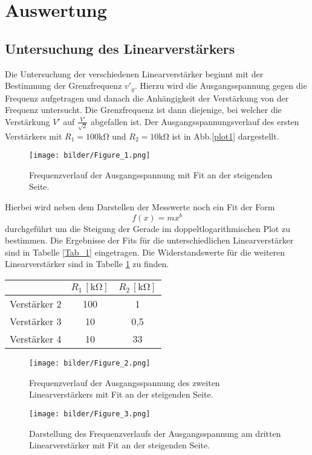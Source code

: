 \section{Auswertung}
\subsection{Untersuchung des Linearverstärkers}
Die Untersuchung der verschiedenen Linearverstärker beginnt mit der Bestimmung der Grenzfrequenz $v'_g$. Hierzu wird die Ausgangsspannung gegen die Frequenz aufgetragen und danach die Anhängigkeit der Verstärkung von der Frequenz untersucht. Die Grenzfrequenz ist dann diejenige, bei welcher die Verstärkung $V'$ auf $\frac{V'}{\sqrt{2}}$ abgefallen ist. Der Ausgangsspannungsverlauf des ersten Verstärkers mit $R_1=100\si{\kilo\ohm}$ und $R_2=10\si{\kilo\ohm}$ ist in Abb.\ref{plot1} dargestellt.
\begin{figure}[h]
  \centering
  \texttt{[image: bilder/Figure\_1.png]}
  \caption{Frequenzverlauf der Ausgangsspannung mit Fit an der steigenden Seite.}
  \label{Aufbau}
\end{figure}
Hierbei wird neben dem Darstellen der Messwerte noch ein Fit der Form
\begin{equation}
f(x)=mx^b
\end{equation}
durchgeführt um die Steigung der Gerade im doppeltlogarithmischen Plot zu bestimmen. Die Ergebnisse der Fits für die unterschiedlichen Linearverstärker sind in Tabelle \ref{Tab_1} eingetragen. Die Widerstandswerte für die weiteren Linearverstärker sind in Tabelle \ref{Tab_2} zu finden.
\begin{table}[]
\centering
\begin{tabular}{c|cc}
&$R_1\,[\si{\kilo\ohm}]$&$R_2\,[\si{\kilo\ohm}]$\\
\hline
Verstärker 2 & 100 & 1   \\
Verstärker 3 & 10  & 0,5 \\
Verstärker 4 & 10  & 33
\end{tabular}
\label{Tab_2}
\end{table}
\begin{figure}[h]
  \centering
  \texttt{[image: bilder/Figure\_2.png]}
  \caption{Frequenzverlauf der Ausgangsspannung des zweiten Linearverstärkers mit Fit an der steigenden Seite.}
  \label{Aufbau}
\end{figure}
\begin{figure}[h]
  \centering
  \texttt{[image: bilder/Figure\_3.png]}
  \caption{Darstellung des Frequenzverlaufs der Ausgangsspannung am dritten Linearverstärker mit Fit an der steigenden Seite.}
  \label{Aufbau}
\end{figure}
